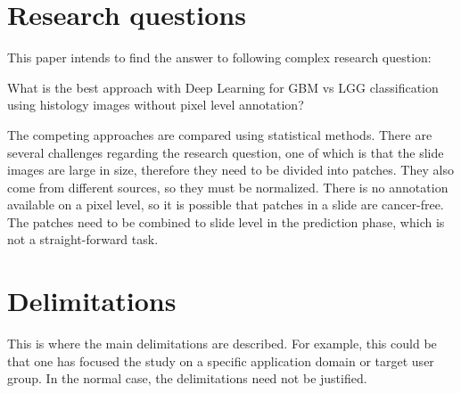 \section{Research questions}
\label{sec:research-questions}

This paper intends to find the answer to following complex research question:

What is the best approach with Deep Learning for GBM vs LGG classification using histology images without pixel level annotation?

The competing approaches are compared using statistical methods. There are several challenges regarding the research question, one of which is that the slide images are large in size, therefore they need to be divided into patches. They also come from different sources, so they must be normalized. There is no annotation available on a pixel level, so it is possible that patches in a slide are cancer-free. The patches need to be combined to slide level in the prediction phase, which is not a straight-forward task.


\section{Delimitations}
\label{sec:delimitations}

This is where the main delimitations are described. For
example, this could be that one has focused the study on a
specific application domain or target user group. In the
normal case, the delimitations need not be justified.




